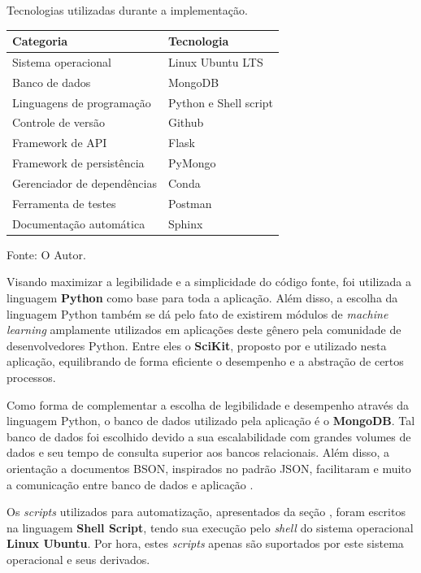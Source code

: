 \begin{quadro}[htp]

	\caption{\label{technologies}Tecnologias utilizadas durante a implementação.}
	\centering
	\begin{tabular}{|l|l|}
	\hline
	\textbf{Categoria} 			& \textbf{Tecnologia}   \\ \hline
	Sistema operacional 		& Linux Ubuntu LTS      \\ \hline
	Banco de dados 		   		& MongoDB  				\\ \hline
	Linguagens de programação   & Python e Shell script \\ \hline
	Controle de versão          & Github   				\\ \hline
	Framework de API        	& Flask      			\\ \hline
	Framework de persistência 	& PyMongo 				\\ \hline
	Gerenciador de dependências & Conda 				\\ \hline
	Ferramenta de testes		& Postman				\\ \hline
	Documentação automática		& Sphinx				\\ \hline
	\end{tabular}

	Fonte: O Autor.

\end{quadro}

Visando maximizar a legibilidade e a simplicidade do código fonte, foi utilizada a linguagem \textbf{Python} como base para toda a aplicação. Além disso, a escolha da linguagem Python também se dá pelo fato de existirem módulos de \textit{machine learning} amplamente utilizados em aplicações deste gênero pela comunidade de desenvolvedores Python. Entre eles o \textbf{SciKit}, proposto por  e utilizado nesta aplicação, equilibrando de forma eficiente o desempenho e a abstração de certos processos.

Como forma de complementar a escolha de legibilidade e desempenho através da linguagem Python, o banco de dados utilizado pela aplicação é o \textbf{MongoDB}. Tal banco de dados foi escolhido devido a sua escalabilidade com grandes volumes de dados e seu tempo de consulta superior aos bancos relacionais. Além disso, a orientação a documentos BSON, inspirados no padrão JSON, facilitaram e muito a comunicação entre banco de dados e aplicação \cite{chodorow2013mongodb}.

Os \textit{scripts} utilizados para automatização, apresentados da seção , foram escritos na linguagem \textbf{Shell Script}, tendo sua execução pelo \textit{shell} do sistema operacional \textbf{Linux Ubuntu}. Por hora, estes \textit{scripts} apenas são suportados por este sistema operacional e seus derivados.

